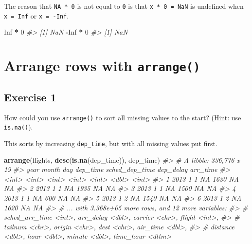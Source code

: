 \documentclass[]{book}
\newenvironment{Shaded}{\begin{snugshade}}{\end{snugshade}}
\newcommand{\CommentTok}[1]{\textcolor[rgb]{0.56,0.35,0.01}{\textit{#1}}}
\newcommand{\DecValTok}[1]{\textcolor[rgb]{0.00,0.00,0.81}{#1}}
\newcommand{\KeywordTok}[1]{\textcolor[rgb]{0.13,0.29,0.53}{\textbf{#1}}}
\newcommand{\NormalTok}[1]{#1}
\newcommand{\OperatorTok}[1]{\textcolor[rgb]{0.81,0.36,0.00}{\textbf{#1}}}
\newcommand{\OtherTok}[1]{\textcolor[rgb]{0.56,0.35,0.01}{#1}}
\newcommand{\StringTok}[1]{\textcolor[rgb]{0.31,0.60,0.02}{#1}}
\theoremstyle{definition}
\theoremstyle{definition}
\theoremstyle{definition}
\theoremstyle{remark}
\begin{document}
The reason that \texttt{NA\ *\ 0} is not equal to \texttt{0} is that
\texttt{x\ *\ 0\ =\ NaN} is undefined when \texttt{x\ =\ Inf} or
\texttt{x\ =\ -Inf}.

\begin{Shaded}
\begin{Highlighting}[]
\OtherTok{Inf} \OperatorTok{*}\StringTok{ }\DecValTok{0}
\CommentTok{#> [1] NaN}
\OperatorTok{-}\OtherTok{Inf} \OperatorTok{*}\StringTok{ }\DecValTok{0}
\CommentTok{#> [1] NaN}
\end{Highlighting}
\end{Shaded}

\hypertarget{arrange-rows-with-arrange}{%
\section{\texorpdfstring{Arrange rows with
\texttt{arrange()}}{Arrange rows with arrange()}}\label{arrange-rows-with-arrange}}

\hypertarget{exercise-1-2}{%
\subsection{Exercise 1}\label{exercise-1-2}}

How could you use \texttt{arrange()} to sort all missing values to the
start? (Hint: use \texttt{is.na()}).

This sorts by increasing \texttt{dep\_time}, but with all missing values
put first.

\begin{Shaded}
\begin{Highlighting}[]
\KeywordTok{arrange}\NormalTok{(flights, }\KeywordTok{desc}\NormalTok{(}\KeywordTok{is.na}\NormalTok{(dep_time)), dep_time)}
\CommentTok{#> # A tibble: 336,776 x 19}
\CommentTok{#>    year month   day dep_time sched_dep_time dep_delay arr_time}
\CommentTok{#>   <int> <int> <int>    <int>          <int>     <dbl>    <int>}
\CommentTok{#> 1  2013     1     1       NA           1630        NA       NA}
\CommentTok{#> 2  2013     1     1       NA           1935        NA       NA}
\CommentTok{#> 3  2013     1     1       NA           1500        NA       NA}
\CommentTok{#> 4  2013     1     1       NA            600        NA       NA}
\CommentTok{#> 5  2013     1     2       NA           1540        NA       NA}
\CommentTok{#> 6  2013     1     2       NA           1620        NA       NA}
\CommentTok{#> # ... with 3.368e+05 more rows, and 12 more variables:}
\CommentTok{#> #   sched_arr_time <int>, arr_delay <dbl>, carrier <chr>, flight <int>,}
\CommentTok{#> #   tailnum <chr>, origin <chr>, dest <chr>, air_time <dbl>,}
\CommentTok{#> #   distance <dbl>, hour <dbl>, minute <dbl>, time_hour <dttm>}
\end{Highlighting}
\end{Shaded}
\end{document}
